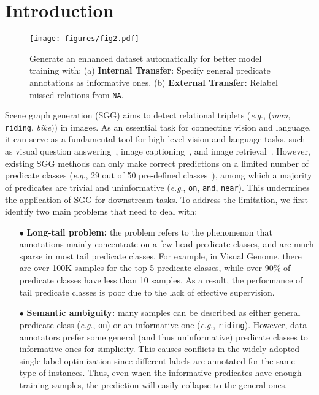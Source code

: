 \documentclass[runningheads]{llncs}
\newcommand{\eg}{\textit{e}.\textit{g}.}
\begin{document}
\section{Introduction}

\begin{figure}[t]
    \centering
    \texttt{[image: figures/fig2.pdf]}
    \caption{Generate an enhanced dataset automatically for better model training with: (a) \textbf{Internal Transfer}: Specify general predicate annotations as informative ones. (b) \textbf{External Transfer}: Relabel missed relations from \texttt{NA}.}
    \label{fig:example}
\end{figure}


Scene graph generation (SGG) aims to detect relational triplets (\eg, (\textit{man}, \texttt{riding}, \textit{bike})) in images. 
As an essential task for connecting vision and language, it can serve as a fundamental tool for high-level vision and language tasks, such as visual question answering~\cite{vqa2015antol,sggforvqa2017teney,xiao2022video,li2022invariant}, image captioning~\cite{auto2019yang,unpaired2019gu}, and image retrieval~\cite{imrt2015johnson,cross2020wang,wei2022rethinking}. However, existing SGG methods can only make correct predictions on a limited number of predicate classes (\eg, 29 out of 50 pre-defined classes~\cite{zellers2018motif}), among which a majority of predicates are trivial and uninformative (\eg, \texttt{on}, \texttt{and}, \texttt{near}).
This undermines the application of SGG for downstream tasks.
To address the limitation, we first identify two main problems that need to deal with:

\begin{itemize}
    \item[$\bullet$] \textbf{Long-tail problem:} the problem refers to the phenomenon that annotations mainly concentrate on a few head predicate classes, and are much sparse in most tail predicate classes. For example, in Visual Genome\cite{krishna2017visual}, there are over 100K samples for the top 5 predicate classes, while over 90\% of predicate classes have less than 10 samples. As a result, the performance of tail predicate classes is poor due to the lack of effective supervision.
    \item[$\bullet$] \textbf{Semantic ambiguity:} many samples can be described as either general predicate class (\eg, \texttt{on}) or an informative one (\eg, \texttt{riding}). However, data annotators prefer some general (and thus uninformative) predicate classes to informative ones for simplicity. This causes conflicts in the widely adopted single-label optimization since different labels are annotated for the same type of instances. Thus, even when the informative predicates have enough training samples, the prediction will easily collapse to the general ones.
\end{itemize}
\end{document}
